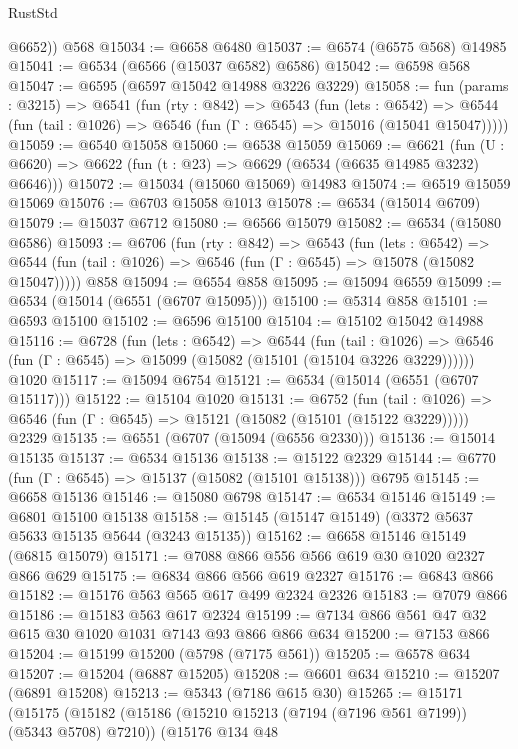 \begin{lexlean}{RustStd}
\begin{coremodule}
        @6652))
    @568
@15034 := @6658 @6480
@15037 := @6574 (@6575 @568) @14985
@15041 := @6534 (@6566 (@15037 @6582) @6586)
@15042 := @6598 @568
@15047 := @6595 (@6597 @15042 @14988 @3226 @3229)
@15058 := fun (params : @3215) =>
  @6541
    (fun (rty : @842) =>
    @6543
      (fun (lets : @6542) =>
      @6544 (fun (tail : @1026) => @6546 (fun (Γ : @6545) => @15016 (@15041 @15047)))))
@15059 := @6540 @15058
@15060 := @6538 @15059
@15069 := @6621
    (fun (U : @6620) => @6622 (fun (t : @23) => @6629 (@6534 (@6635 @14985 @3232) @6646)))
@15072 := @15034 (@15060 @15069) @14983
@15074 := @6519 @15059 @15069
@15076 := @6703 @15058 @1013
@15078 := @6534 (@15014 @6709)
@15079 := @15037 @6712
@15080 := @6566 @15079
@15082 := @6534 (@15080 @6586)
@15093 := @6706
    (fun (rty : @842) =>
    @6543
      (fun (lets : @6542) =>
      @6544 (fun (tail : @1026) => @6546 (fun (Γ : @6545) => @15078 (@15082 @15047)))))
    @858
@15094 := @6554 @858
@15095 := @15094 @6559
@15099 := @6534 (@15014 (@6551 (@6707 @15095)))
@15100 := @5314 @858
@15101 := @6593 @15100
@15102 := @6596 @15100
@15104 := @15102 @15042 @14988
@15116 := @6728
    (fun (lets : @6542) =>
    @6544
      (fun (tail : @1026) =>
      @6546 (fun (Γ : @6545) => @15099 (@15082 (@15101 (@15104 @3226 @3229))))))
    @1020
@15117 := @15094 @6754
@15121 := @6534 (@15014 (@6551 (@6707 @15117)))
@15122 := @15104 @1020
@15131 := @6752
    (fun (tail : @1026) => @6546 (fun (Γ : @6545) => @15121 (@15082 (@15101 (@15122 @3229)))))
    @2329
@15135 := @6551 (@6707 (@15094 (@6556 @2330)))
@15136 := @15014 @15135
@15137 := @6534 @15136
@15138 := @15122 @2329
@15144 := @6770 (fun (Γ : @6545) => @15137 (@15082 (@15101 @15138))) @6795
@15145 := @6658 @15136
@15146 := @15080 @6798
@15147 := @6534 @15146
@15149 := @6801 @15100 @15138
@15158 := @15145 (@15147 @15149) (@3372 @5637 @5633 @15135 @5644 (@3243 @15135))
@15162 := @6658 @15146 @15149 (@6815 @15079)
@15171 := @7088 @866 @556 @566 @619 @30 @1020 @2327 @866 @629
@15175 := @6834 @866 @566 @619 @2327
@15176 := @6843 @866
@15182 := @15176 @563 @565 @617 @499 @2324 @2326
@15183 := @7079 @866
@15186 := @15183 @563 @617 @2324
@15199 := @7134 @866 @561 @47 @32 @615 @30 @1020 @1031 @7143 @93 @866 @866 @634
@15200 := @7153 @866
@15204 := @15199 @15200 (@5798 (@7175 @561))
@15205 := @6578 @634
@15207 := @15204 (@6887 @15205)
@15208 := @6601 @634
@15210 := @15207 (@6891 @15208)
@15213 := @5343 (@7186 @615 @30)
@15265 := @15171
    (@15175
      (@15182
        (@15186 (@15210 @15213 (@7194 (@7196 @561 @7199)) (@5343 @5708) @7210))
        (@15176
          @134
          @48

\end{coremodule}
\end{lexlean}
